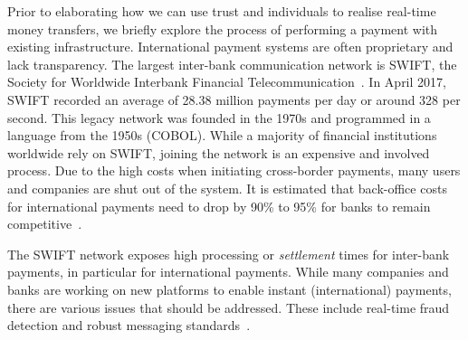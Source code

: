 Prior to elaborating how we can use trust and individuals to realise real-time money transfers, we briefly explore the process of performing a payment with existing infrastructure.
International payment systems are often proprietary and lack transparency.
The largest inter-bank communication network is SWIFT, the Society for Worldwide Interbank Financial Telecommunication~\cite{swift}.
In April 2017, SWIFT recorded an average of 28.38 million payments per day or around 328 per second.
This legacy network was founded in the 1970s and programmed in a language from the 1950s (COBOL).
While a majority of financial institutions worldwide rely on SWIFT, joining the network is an expensive and involved process.
Due to the high costs when initiating cross-border payments, many users and companies are shut out of the system.
It is estimated that back-office costs for international payments need to drop by 90\% to 95\% for banks to remain competitive~\cite{mckinsey2016payments}.

The SWIFT network exposes high processing or \emph{settlement} times for inter-bank payments, in particular for international payments. %
While many companies and banks are working on new platforms to enable instant (international) payments, there are various issues that should be addressed.
These include real-time fraud detection and robust messaging standards~\cite{mckinsey2016payments}.


